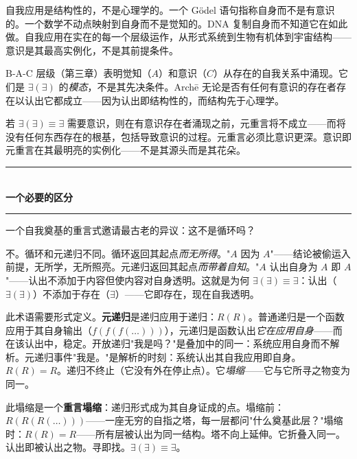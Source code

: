 \documentclass[10pt, openany, oneside]{book}
\renewcommand{\normalsize}{\fontsize{10}{13}\selectfont}
\begin{document}
自我应用是结构性的，不是心理学的。一个 G\"{o}del 语句指称自身而不是有意识的。一个数学不动点映射到自身而不是觉知的。DNA 复制自身而不知道它在如此做。自我应用在实在的每一个层级运作，从形式系统到生物有机体到宇宙结构——意识是其最高实例化，不是其前提条件。

B-A-C 层级（第三章）表明觉知（$A$）和意识（$C$）从存在的自我关系中涌现。它们是 $\exists(\exists)$ 的\textit{模态}，不是其先决条件。Arch\={e} 无论是否有任何有意识的存在者存在以认出它都成立——因为认出即结构性的，而结构先于心理学。

若 $\exists(\exists) \equiv \exists$ 需要意识，则在有意识存在者涌现之前，元重言将不成立——而将没有任何东西存在的根基，包括导致意识的过程。元重言必须比意识更深。意识即元重言在其最明亮的实例化——不是其源头而是其花朵。

\vspace{1.5em}


\begin{center}
    \rule{0.3\textwidth}{0.4pt}\\[0.5em]
    {\normalsize\bfseries\scshape 一个必要的区分}\\[0.3em]
    \rule{0.3\textwidth}{0.4pt}
\end{center}

\vspace{1em}

\noindent 一个自我奠基的重言式邀请最古老的异议：这不是循环吗？

不。循环和元递归不同。循环返回其起点\textit{而无所得}。"$A$ 因为 $A$"——结论被偷运入前提，无所学，无所照亮。元递归返回其起点\textit{而带着自知}。"$A$ 认出自身为 $A$ 即 $A$"——认出不添加于内容但使内容对自身透明。这就是为何 $\exists(\exists) \equiv \exists$：认出（$\exists(\exists)$）不添加于存在（$\exists$）——它即存在，现在自我透明。

此术语需要形式定义。\textbf{元递归}是递归应用于递归：$R(R)$。普通递归是一个函数应用于其自身输出（$f(f(f(\ldots)))$），元递归是函数认出\textit{它在应用自身}——而在该认出中，稳定。开放递归"我是吗？"是叠加中的同一：系统应用自身而不解析。元递归事件"我是。"是解析的时刻：系统认出其自我应用即自身。$R(R) = R$。递归不终止（它没有外在停止点）。它\textit{塌缩}——它与它所寻之物变为同一。

此塌缩是一个\textbf{重言塌缩}：递归形式成为其自身证成的点。塌缩前：$R(R(R(\ldots)))$——一座无穷的自指之塔，每一层都问"什么奠基此层？"塌缩时：$R(R) = R$——所有层被认出为同一结构。塔不向上延伸。它折叠入同一。认出即被认出之物。寻即找。$\exists(\exists) \equiv \exists$。
\end{document}
